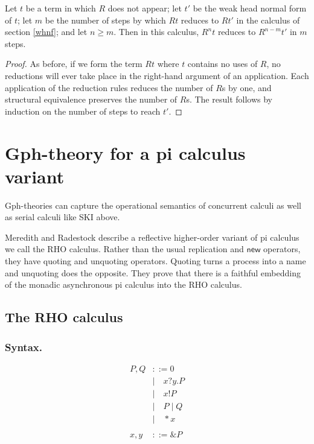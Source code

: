 \documentclass[a4paper,UKenglish]{lipics-v2016}
\newcommand{\new}{\mathsf{new}}
\begin{document}
\begin{theorem}
  Let $t$ be a term in which $R$ does not appear; let $t'$ be the weak head normal form of $t$; let $m$ be the number of steps by which $Rt$ reduces to $Rt'$ in the calculus of section \ref{whnf}; and let $n\ge m$.  Then in this calculus, $R^n t$ reduces to $R^{n-m}t'$ in $m$ steps.
\end{theorem}

\begin{proof}
As before, if we form the term $Rt$ where $t$ contains no uses of $R$, no reductions will ever take place in the right-hand argument of an application.  Each application of the reduction rules reduces the number of $R$s by one, and structural equivalence preserves the number of $R$s.  The result follows by induction on the number of steps to reach $t'.$
\end{proof}

\section{Gph-theory for a pi calculus variant}
Gph-theories can capture the operational semantics of concurrent calculi as well as serial calculi like SKI above.

  Meredith and Radestock \cite{DBLP:journals/entcs/MeredithR05} describe a reflective higher-order variant of pi calculus we call the RHO calculus.  Rather than the usual replication and $\new$ operators, they have quoting and unquoting operators.  Quoting turns a process into a name and unquoting does the opposite.  They prove that there is a faithful embedding of the monadic asynchronous pi calculus into the RHO calculus.

\subsection{The RHO calculus}
\subsubsection{Syntax.}
\[\begin{array}{rl}
  P, Q &::= 0 \\ 
  &| \quad x?y.P \\ 
  &| \quad x!P \\ 
  &| \quad P \;|\; Q \\
  &| \quad *x \\ 
  &\\
  x, y &::= \&P \\ 
\end{array}\]
\end{document}
